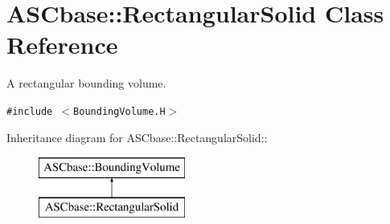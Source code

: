 \section{ASCbase::Rectangular\-Solid Class Reference}
\label{classASCbase_1_1RectangularSolid}
A rectangular bounding volume.  


{\tt \#include $<$Bounding\-Volume.H$>$}

Inheritance diagram for ASCbase::Rectangular\-Solid::\begin{figure}[H]
\begin{center}
\leavevmode
\includegraphics[height=2cm]{classASCbase_1_1RectangularSolid}
\end{center}
\end{figure}
